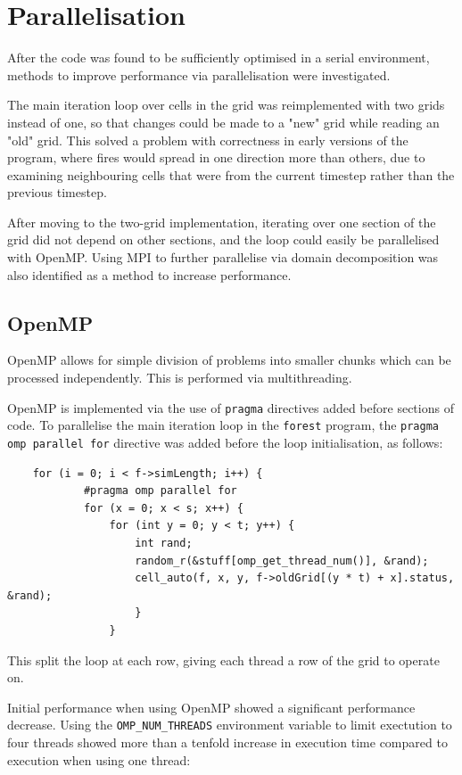 \documentclass[11pt,a4paper]{report}
\begin{document}
\section{Parallelisation}

After the code was found to be sufficiently optimised in a serial environment,
methods to improve performance via parallelisation were investigated.

The main iteration loop over cells in the grid was reimplemented with two grids
instead of one, so that changes could be made to a "new" grid while reading an
"old" grid. This solved a problem with correctness in early versions of the
program, where fires would spread in one direction more than others, due to
examining neighbouring cells that were from the current timestep rather than
the previous timestep.

After moving to the two-grid implementation, iterating over one section of the
grid did not depend on other sections, and the loop could easily be
parallelised with OpenMP. Using MPI to further parallelise via domain
decomposition was also identified as a method to increase performance.

\subsection{OpenMP}

OpenMP allows for simple division of problems into smaller chunks which can be
processed independently. This is performed via multithreading.

OpenMP is implemented via the use of \texttt{pragma} directives added before
sections of code. To parallelise the main iteration loop in the \texttt{forest}
program, the \texttt{pragma omp parallel for} directive was added before the
loop initialisation, as follows:

\begin{verbatim}
    for (i = 0; i < f->simLength; i++) {
            #pragma omp parallel for
            for (x = 0; x < s; x++) {
                for (int y = 0; y < t; y++) {
                    int rand;
                    random_r(&stuff[omp_get_thread_num()], &rand);
                    cell_auto(f, x, y, f->oldGrid[(y * t) + x].status, &rand);
                    }
                }
\end{verbatim}

This split the loop at each row, giving each thread a row of the grid to
operate on.

Initial performance when using OpenMP showed a significant performance
decrease. Using the \texttt{OMP\_NUM\_THREADS} environment variable to limit
exectution to four threads showed more than a tenfold increase in execution time compared to
execution when using one thread:
\end{document}
